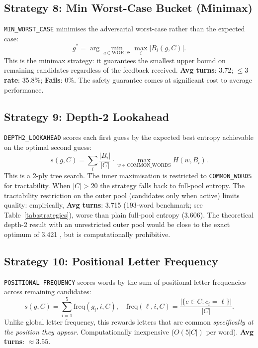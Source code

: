 \documentclass{article}
\begin{document}
\subsection{Strategy 8: Min Worst-Case Bucket (Minimax)}
\label{sec:strategy8}

\texttt{MIN\_WORST\_CASE} minimises the adversarial worst-case rather than the
expected case:
\[
  g^* = \arg\min_{g \in \text{WORDS}} \max_i |B_i(g, C)|.
\]
This is the minimax strategy: it guarantees the smallest upper bound on remaining
candidates regardless of the feedback received. \textbf{Avg turns}: 3.72;
\textbf{$\leq 3$ rate}: 35.8\%; \textbf{Fails}: 0\%. The safety guarantee comes at
significant cost to average performance.

\subsection{Strategy 9: Depth-2 Lookahead}
\label{sec:strategy9}

\texttt{DEPTH2\_LOOKAHEAD} scores each first guess by the expected best entropy
achievable on the optimal second guess:
\[
  s(g, C) = \sum_{i} \frac{|B_i|}{|C|} \cdot \max_{w \in \text{COMMON\_WORDS}} H(w, B_i).
\]
This is a 2-ply tree search. The inner maximisation is restricted to
\texttt{COMMON\_WORDS} for tractability. When $|C| > 20$ the strategy falls back to
full-pool entropy. The tractability restriction on the outer pool (candidates only
when active) limits quality: empirically, \textbf{Avg turns}: 3.715 (193-word
benchmark; see Table~\ref{tab:strategies}), worse than plain full-pool entropy
(3.606). The theoretical depth-2 result with an unrestricted outer pool would be
close to the exact optimum of 3.421 \citep{bertsimas2025exact}, but is computationally prohibitive.

\subsection{Strategy 10: Positional Letter Frequency}
\label{sec:strategy10}

\texttt{POSITIONAL\_FREQUENCY} scores words by the sum of positional letter
frequencies across remaining candidates:
\[
  s(g, C) = \sum_{i=1}^{5} \text{freq}(g_i, i, C), \quad
  \text{freq}(\ell, i, C) = \frac{|\{c \in C : c_i = \ell\}|}{|C|}.
\]
Unlike global letter frequency, this rewards letters that are common
\emph{specifically at the position they appear}. Computationally inexpensive
($O(5|C|)$ per word). \textbf{Avg turns}: $\approx 3.55$.
\end{document}

